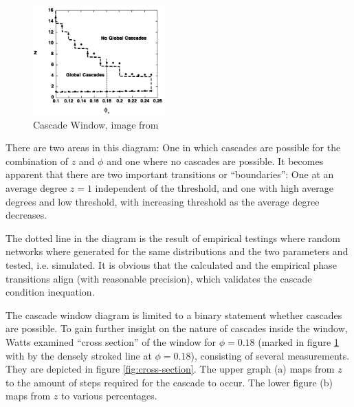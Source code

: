 \documentclass{sig-alternate-05-2015}
\begin{document}
\begin{figure}[h!]
  \centering
  \includegraphics[width=0.45\textwidth]{img/cascade-regimes-with-cross-section.png}
  \caption{Cascade Window, image from \cite{simplemodel}}
  \label{fig:cascade-window}
\end{figure}

There are two areas in this diagram: One in which cascades are possible for the combination of $z$ and $\phi$ and one where no cascades are possible. It becomes apparent that there are two important transitions or ``boundaries'': One at an average degree $z = 1$ independent of the threshold, and one with high average degrees and low threshold, with increasing threshold as the average degree decreases.

The dotted line in the diagram is the result of empirical testings where random networks where generated for the same distributions and the two parameters and tested, i.e. simulated. It is obvious that the calculated and the empirical phase transitions align (with reasonable precision), which validates the cascade condition inequation.

The cascade window diagram is limited to a binary statement whether cascades are possible. To gain further insight on  the nature of cascades inside the window, Watts examined ``cross section'' of the window for $\phi=0.18$ (marked in figure \ref{fig:cascade-window} with by the densely stroked line at $\phi=0.18$), consisting of several measurements. They are depicted in figure \ref{fig:cross-section}. The upper graph (a) maps from $z$ to the amount of steps required for the cascade to occur. The lower figure (b) maps from $z$ to various percentages.
\end{document}
